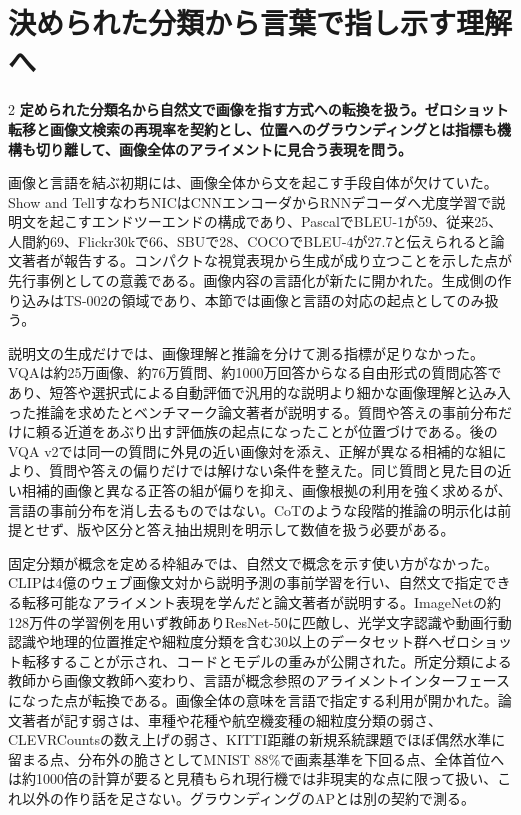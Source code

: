 \documentclass[lualatex,a4paper,10pt]{jlreq}
\begin{document}
\section{決められた分類から言葉で指し示す理解へ}
\label{sec:p07a}
\begin{multicols}{2}
\raggedcolumns
\noindent\textbf{定められた分類名から自然文で画像を指す方式への転換を扱う。ゼロショット転移と画像文検索の再現率を契約とし、位置へのグラウンディングとは指標も機構も切り離して、画像全体のアライメントに見合う表現を問う。}\autocite{vmd039,vmd038}\par\medskip
\noindent 画像と言語を結ぶ初期には、画像全体から文を起こす手段自体が欠けていた。Show and TellすなわちNICはCNNエンコーダからRNNデコーダへ尤度学習で説明文を起こすエンドツーエンドの構成であり、PascalでBLEU-1が59、従来25、人間約69、Flickr30kで66、SBUで28、COCOでBLEU-4が27.7と伝えられると論文著者が報告する。コンパクトな視覚表現から生成が成り立つことを示した点が先行事例としての意義である。画像内容の言語化が新たに開かれた。生成側の作り込みはTS-002の領域であり、本節では画像と言語の対応の起点としてのみ扱う。\autocite{vmd037}\par\medskip
\noindent 説明文の生成だけでは、画像理解と推論を分けて測る指標が足りなかった。VQAは約25万画像、約76万質問、約1000万回答からなる自由形式の質問応答であり、短答や選択式による自動評価で汎用的な説明より細かな画像理解と込み入った推論を求めたとベンチマーク論文著者が説明する。質問や答えの事前分布だけに頼る近道をあぶり出す評価族の起点になったことが位置づけである。後のVQA v2では同一の質問に外見の近い画像対を添え、正解が異なる相補的な組により、質問や答えの偏りだけでは解けない条件を整えた。同じ質問と見た目の近い相補的画像と異なる正答の組が偏りを抑え、画像根拠の利用を強く求めるが、言語の事前分布を消し去るものではない。CoTのような段階的推論の明示化は前提とせず、版や区分と答え抽出規則を明示して数値を扱う必要がある。\autocite{vmd038}\par\medskip
\noindent 固定分類が概念を定める枠組みでは、自然文で概念を示す使い方がなかった。CLIPは4億のウェブ画像文対から説明予測の事前学習を行い、自然文で指定できる転移可能なアライメント表現を学んだと論文著者が説明する。ImageNetの約128万件の学習例を用いず教師ありResNet-50に匹敵し、光学文字認識や動画行動認識や地理的位置推定や細粒度分類を含む30以上のデータセット群へゼロショット転移することが示され、コードとモデルの重みが公開された。所定分類による教師から画像文教師へ変わり、言語が概念参照のアライメントインターフェースになった点が転換である。画像全体の意味を言語で指定する利用が開かれた。論文著者が記す弱さは、車種や花種や航空機変種の細粒度分類の弱さ、CLEVRCountsの数え上げの弱さ、KITTI距離の新規系統課題でほぼ偶然水準に留まる点、分布外の脆さとしてMNIST 88\%で画素基準を下回る点、全体首位へは約1000倍の計算が要ると見積もられ現行機では非現実的な点に限って扱い、これ以外の作り話を足さない。グラウンディングのAPとは別の契約で測る。\autocite{vmd039}\par\medskip

\end{multicols}
\end{document}
